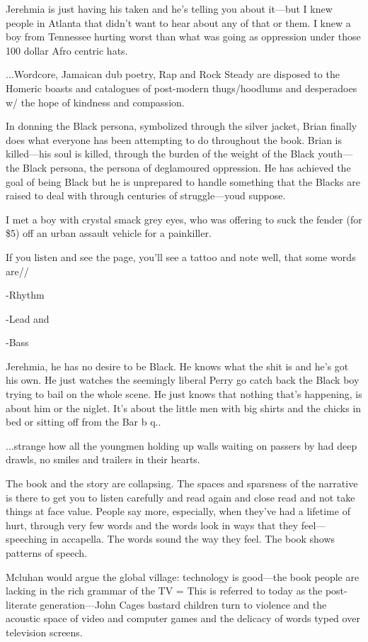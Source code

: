 Jerehmia is just having his taken and he's telling you about it---but I
knew people in Atlanta that didn't want to hear about any of that or
them. I knew a boy from Tennessee hurting worst than what was going as
oppression under those 100 dollar Afro centric hats.

...Wordcore, Jamaican dub poetry, Rap and Rock Steady are disposed to
the Homeric boasts and catalogues of post-modern thugs/hoodlums and
desperadoes w/ the hope of kindness and compassion.

In donning the Black persona, symbolized through the silver jacket,
Brian finally does what everyone has been attempting to do throughout
the book. Brian is killed---his soul is killed, through the burden of
the weight of the Black youth---the Black persona, the persona of
deglamoured oppression. He has achieved the goal of being Black but he
is unprepared to handle something that the Blacks are raised to deal
with through centuries of struggle---youd suppose.

I met a boy with crystal smack grey eyes, who was offering to suck the
fender (for \$5) off an urban assault vehicle for a painkiller.

If you listen and see the page, you'll see a tattoo and note well, that
some words are//

-Rhythm

-Lead and

-Bass

Jerehmia, he has no desire to be Black. He knows what the shit is and
he's got his own. He just watches the seemingly liberal Perry go catch
back the Black boy trying to bail on the whole scene. He just knows that
nothing that's happening, is about him or the niglet. It's about the
little men with big shirts and the chicks in bed or sitting off from the
Bar b q..

...strange how all the youngmen holding up walls waiting on passers by
had deep drawls, no smiles and trailers in their hearts.

The book and the story are collapsing. The spaces and sparsness of the
narrative is there to get you to listen carefully and read again and
close read and not take things at face value. People say more,
especially, when they've had a lifetime of hurt, through very few words
and the words look in ways that they feel---speeching in accapella. The
words sound the way they feel. The book shows patterns of speech.

Mcluhan would argue the global village: technology is good---the book
people are lacking in the rich grammar of the TV = This is referred to
today as the post-literate generation---John Cages bastard children turn
to violence and the acoustic space of video and computer games and the
delicacy of words typed over television screens.

